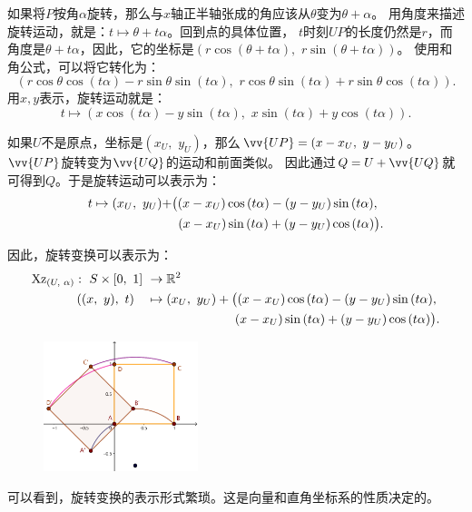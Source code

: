 \documentclass[12pt,UTF8]{ctexbook}
\begin{document}
如果将$P$按角$\alpha$旋转，那么与$x$轴正半轴张成的角应该从$\theta$变为$\theta + \alpha$。
用角度来描述旋转运动，就是：$t \mapsto \theta + t\alpha$。回到点的具体位置，
$t$时刻$UP$的长度仍然是$r$，而角度是$\theta + t\alpha$，因此，它的坐标是$(r\cos{(\theta + t\alpha)},\,\,r\sin{(\theta + t\alpha)})$。
使用和角公式，可以将它转化为：
$$(r\cos{\theta}\cos{(t\alpha)} - r\sin{\theta}\sin{(t\alpha)},\,\,r\cos{\theta}\sin{(t\alpha)} + r\sin{\theta}\cos{(t\alpha)}).$$
用$x,y$表示，旋转运动就是：
$$ t \mapsto \left(x\cos{(t\alpha)} - y\sin{(t\alpha)}, \,\,x\sin{(t\alpha)} + y\cos{(t\alpha)}\right).$$

如果$U$不是原点，坐标是$(x_U, \,\,y_U)$，那么$\vv{UP} = (x - x_U, \,\, y - y_U)$。$\vv{UP}$旋转变为$\vv{UQ}$的运动和前面类似。
因此通过$Q = U + \vv{UQ}$就可得到$Q$。于是旋转运动可以表示为：
\begin{align}
    t \mapsto (x_U,\,\,y_U) + &\big((x - x_U)\cos{(t\alpha)} - (y - y_U)\sin{(t\alpha)},\notag \\
    &\,\,\,(x - x_U)\sin{(t\alpha)} + (y - y_U)\cos{(t\alpha)}\big).\notag
\end{align}

因此，旋转变换可以表示为：
\begin{align}
    \mathrm{Xz}_{(U,\,\,\alpha)}: \,\, S\times[0,\,\,1] \,\,&\rightarrow \mathbb{R}^2 \notag \\
    ((x,\,\,y),\,\, t) \quad &\mapsto (x_U,\,\,y_U)+\big((x - x_U)\cos{(t\alpha)} - (y - y_U)\sin{(t\alpha)},\notag \\
    &\qquad\qquad\qquad\quad(x - x_U)\sin{(t\alpha)} + (y - y_U)\cos{(t\alpha)}\big). \notag
\end{align}

\begin{figure} %
    \vspace{-22pt}
    \flushright
    \includegraphics[width=0.4\textwidth]{旋转变换例2.png}
\end{figure}

可以看到，旋转变换的表示形式繁琐。这是向量和直角坐标系的性质决定的。
\end{document}
